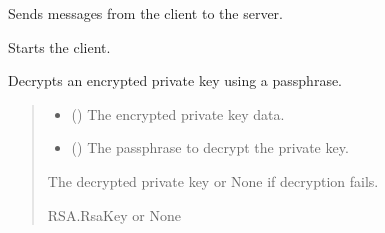 \documentclass[letterpaper,10pt,english]{sphinxmanual}
\begin{document}
\begin{fulllineitems}
\begin{fulllineitems}
\end{fulllineitems}


\begin{fulllineitems}
\label{\detokenize{client1:client1.Client.send_message}}
\pysigstartsignatures
{}
\pysigstopsignatures
\sphinxAtStartPar
Sends messages from the client to the server.

\end{fulllineitems}


\begin{fulllineitems}
\label{\detokenize{client1:client1.Client.start}}
\pysigstartsignatures
{}
\pysigstopsignatures
\sphinxAtStartPar
Starts the client.

\end{fulllineitems}


\end{fulllineitems}


\begin{fulllineitems}
\label{\detokenize{client1:client1.decrypt_private_key}}
\pysigstartsignatures
{}
\pysigstopsignatures
\sphinxAtStartPar
Decrypts an encrypted private key using a passphrase.
\begin{quote}\begin{description}
\begin{itemize}
\item {} 
\sphinxAtStartPar
{} () \textendash{} The encrypted private key data.

\item {} 
\sphinxAtStartPar
{} () \textendash{} The passphrase to decrypt the private key.

\end{itemize}

\sphinxAtStartPar
The decrypted private key or None if decryption fails.

\sphinxAtStartPar
RSA.RsaKey or None

\end{description}\end{quote}

\end{fulllineitems}
\end{document}
